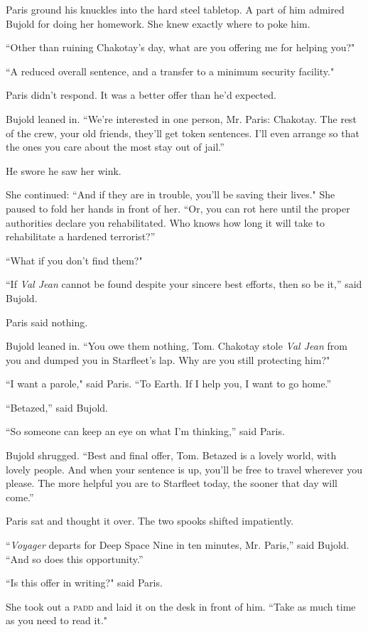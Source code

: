 \documentclass[twoside,letterpaper,12pt]{memoir}
\begin{document}
Paris ground his knuckles into the hard steel tabletop. A part of him admired Bujold for doing her homework. She knew exactly where to poke him.

``Other than ruining Chakotay's day, what are you offering me for helping you?"

``A reduced overall sentence, and a transfer to a minimum security facility."

Paris didn't respond. It was a better offer than he'd expected.

Bujold leaned in. ``We're interested in one person, Mr. Paris: Chakotay. The rest of the crew, your old friends, they'll get token sentences. I'll even arrange so that the ones you care about the most stay out of jail.''

He swore he saw her wink.

She continued: ``And if they are in trouble, you'll be saving their lives." She paused to fold her hands in front of her. ``Or, you can rot here until the proper authorities declare you rehabilitated. Who knows how long it will take to rehabilitate a hardened terrorist?''

``What if you don't find them?"

``If \textit{Val Jean} cannot be found despite your sincere best efforts, then so be it,'' said Bujold.

Paris said nothing.

Bujold leaned in. ``You owe them nothing, Tom. Chakotay stole \textit{Val Jean} from you and dumped you in Starfleet's lap. Why are you still protecting him?"

``I want a parole," said Paris. ``To Earth. If I help you, I want to go home.''

``Betazed,'' said Bujold.

``So someone can keep an eye on what I'm thinking,'' said Paris.

Bujold shrugged. ``Best and final offer, Tom. Betazed is a lovely world, with lovely people. And when your sentence is up, you'll be free to travel wherever you please. The more helpful you are to Starfleet today, the sooner that day will come.''

Paris sat and thought it over. The two spooks shifted impatiently.

``\textit{Voyager} departs for Deep Space Nine in ten minutes, Mr. Paris,'' said Bujold. ``And so does this opportunity.''

``Is this offer in writing?" said Paris.

She took out a \textsc{padd} and laid it on the desk in front of him. ``Take as much time as you need to read it."
\end{document}
